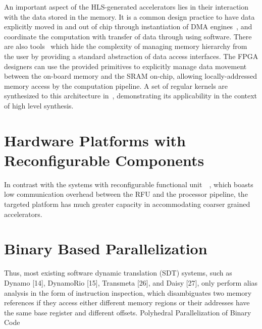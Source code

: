 An important aspect of the HLS-generated accelerators lies in their interaction
with the data stored in the memory.
It is a common design practice to have data explicitly moved in and out of chip through
instantiation of DMA engines~\cite{vivado_hls:appnoteMMult}, and coordinate the computation with transfer of data
through using software. There are also tools~\cite{coram} which hide the 
complexity of managing memory
hierarchy from the user by providing a standard abstraction
of data access interfaces. The FPGA designers can use the
provided primitives to explicitly manage data movement between
the on-board memory and the SRAM on-chip, allowing
locally-addressed memory access by the computation pipeline.
A set of regular kernels are synthesized to this architecture
in~\cite{c2coram}, demonstrating its applicability in the context of high level
synthesis.

\section{Hardware Platforms with Reconfigurable Components}
\label{hetero}


In contrast with the systems with reconfigurable functional unit~\cite{Carrillo:2001:ERU:360276.360328}~\cite{1266409}, which 
boasts low communication overhead between the RFU and the processor pipeline, the targeted platform has much greater capacity in accommodating coarser grained accelerators.



\section{Binary Based Parallelization}
\label{binpar}
Thus, most existing
software dynamic translation (SDT) systems, such as Dynamo [14], DynamoRio [15], Transmeta [26],
and Daisy [27], only perform alias analysis in the form of instruction inspection, which disambiguates
two memory references if they access either different memory regions or their addresses have the
same base register and different offsets.
Polyhedral Parallelization of Binary
Code

